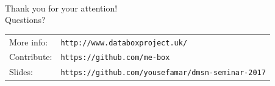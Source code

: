 \documentclass[aspectratio=169]{beamer}
\begin{document}
\begin{frame}[plain,c]
	\begin{center}
		\\[4em]
		\Huge Thank you for your attention!\\[1em]
		\Large Questions?\\[1em]
	\end{center}
	\footnotesize
	\begin{table}[]
		\begin{tabular}{ll}
			More info:&\texttt{http://www.databoxproject.uk/}\\
			Contribute:&\texttt{https://github.com/me-box}\\
			Slides:&\texttt{https://github.com/yousefamar/dmsn-seminar-2017}
		\end{tabular}
	\end{table}
\end{frame}
\end{document}
